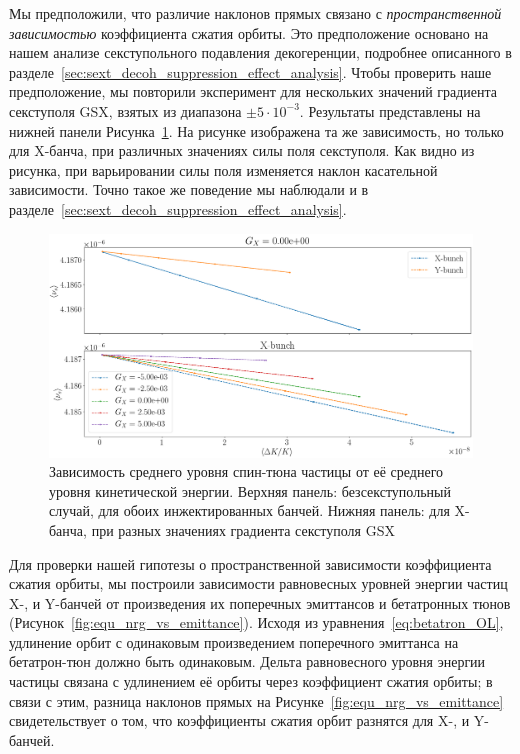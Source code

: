 Мы предположили, что различие наклонов прямых связано с \emph{пространственной зависимостью} коэффициента сжатия орбиты. Это предположение основано на нашем анализе секступольного подавления декогеренции, подробнее описанного в разделе~\ref{sec:sext_decoh_suppression_effect_analysis}. Чтобы проверить наше предположение, мы повторили эксперимент для нескольких значений градиента секступоля GSX, взятых из диапазона $\pm 5\cdot 10^{-3}$.  Результаты представлены на  нижней панели Рисунка~\ref{fig:stune_traj_equ_main}. На рисунке изображена та же зависимость, но только для X-банча, при различных значениях силы поля секступоля. Как видно из рисунка, при варьировании силы поля изменяется наклон касательной зависимости. Точно такое же поведение мы наблюдали и в разделе~\ref{sec:sext_decoh_suppression_effect_analysis}.

\begin{figure}[H]
	\centering
	\includegraphics[height=.3\paperheight]{images/stune_traj_equ/part1/stune_vs_equ_energy}
	\caption[Зависимость среднего уровня спин-тюна частицы от её среднего уровня кинетической энергии.]{Зависимость среднего уровня спин-тюна частицы от её среднего уровня кинетической энергии. Верхняя панель: безсекступольный случай, для обоих инжектированных банчей. Нижняя панель: для X-банча, при разных значениях градиента секступоля GSX\label{fig:stune_traj_equ_main}}
\end{figure}

Для проверки нашей гипотезы о пространственной зависимости коэффициента сжатия орбиты, мы построили зависимости равновесных уровней энергии частиц X-, и Y-банчей от произведения их поперечных эмиттансов и бетатронных тюнов (Рисунок~\ref{fig:equ_nrg_vs_emittance}). Исходя из уравнения~\eqref{eq:betatron_OL}, удлинение орбит с одинаковым произведением поперечного эмиттанса на бетатрон-тюн должно быть одинаковым. Дельта равновесного уровня энергии частицы связана с удлинением её орбиты через коэффициент сжатия орбиты; в связи с этим, разница наклонов прямых на Рисунке~\ref{fig:equ_nrg_vs_emittance} свидетельствует о том, что коэффициенты сжатия орбит разнятся для X-, и Y-банчей. 

